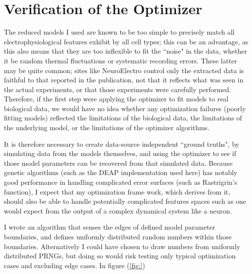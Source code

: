 \section{Verification of the Optimizer}
\label{sec:optimizer-verification}
The reduced models I used are known to be too simple to precisely match all electrophysiological features exhibit by all cell types; this can be an advantage, as this also means that they are too inflexible to fit the ``noise" in the data, whether it be random thermal fluctuations or systematic recording errors.
These latter may be quite common; sites like NeuroElectro control only the extracted data is faithful to that reported in the publication, not that it reflects what was seen in the actual experiments, or that those experiments were carefully performed.
Therefore, if the first step were applying the optimizer to fit models to real biological data, we would have no idea whether any optimization failures (poorly fitting models) reflected the limitations of the biological data, the limitations of the underlying model, or the limitations of the optimizer algorithms.

It is therefore necessary to create data-source independent ``ground truths", by simulating data from the models themselves, and using the optimizer to see if those model parameters can be recovered from that simulated data.
Because genetic algorithms (such as the DEAP \citep{DEAP_JMLR2012} implementation used here) has notably good performance in handling complicated error surfaces (such as Rastrigrin's function), I expect that my optimization frame work, which derives from it, should also be able to handle potentially complicated features spaces such as one would expect from the output of a complex dynamical system like a neuron.

I wrote an algorithm that senses the edges of defined model parameter boundaries, and defines uniformly distributed random numbers within those boundaries. Alternatively I could have chosen to draw numbers from uniformly distributed PRNGs, but doing so would risk testing only typical optimization cases and excluding edge cases. In figure (\ref{fig:})


